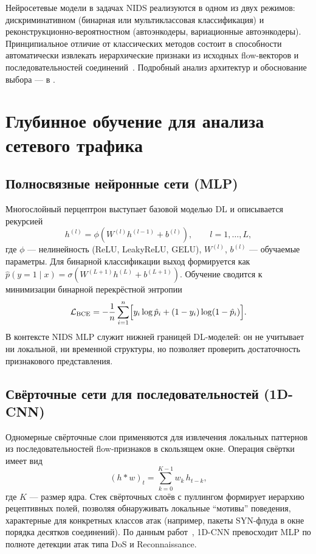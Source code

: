 Нейросетевые модели в задачах NIDS реализуются в одном из двух режимов:
дискриминативном (бинарная или мультиклассовая классификация) и
реконструкционно-вероятностном (автоэнкодеры, вариационные автоэнкодеры).
Принципиальное отличие от классических методов состоит в способности
автоматически извлекать иерархические признаки из исходных flow-векторов и
последовательностей соединений~\cite{lecun2015dl, vinayakumar2019dl,
mirsky2018kitsune}. Подробный анализ архитектур и обоснование выбора --- в
.

\section{Глубинное обучение для анализа сетевого трафика}
\label{sec:dl-architectures}

\subsection{Полносвязные нейронные сети (MLP)}

Многослойный перцептрон выступает базовой моделью DL и описывается
рекурсией
\begin{equation}
h^{(l)} = \phi\!\left(W^{(l)} h^{(l-1)} + b^{(l)}\right),
\qquad l = 1, \dots, L,
\label{eq:mlp}
\end{equation}
где \(\phi\) --- нелинейность (ReLU, LeakyReLU, GELU), \(W^{(l)}\), \(b^{(l)}\)
--- обучаемые параметры. Для бинарной классификации выход формируется как
\(\hat{p}(y=1\mid x) = \sigma(W^{(L+1)} h^{(L)} + b^{(L+1)})\). Обучение
сводится к минимизации бинарной перекрёстной энтропии
\begin{equation}
\mathcal{L}_{\text{BCE}} =
-\frac{1}{n}\sum_{i=1}^{n}\Bigl[y_i \log \hat{p}_i + (1-y_i)\log(1-\hat{p}_i)\Bigr].
\label{eq:bce}
\end{equation}
В контексте NIDS MLP служит нижней границей DL-моделей: он не учитывает ни
локальной, ни временной структуры, но позволяет проверить достаточность
признакового представления.

\subsection{Свёрточные сети для последовательностей (1D-CNN)}

Одномерные свёрточные слои применяются для извлечения локальных паттернов из
последовательностей flow-признаков в скользящем окне. Операция
свёртки имеет вид
\begin{equation}
(h * w)_t = \sum_{k=0}^{K-1} w_k\, h_{t-k},
\label{eq:conv1d}
\end{equation}
где \(K\) --- размер ядра. Стек свёрточных слоёв с пуллингом формирует
иерархию рецептивных полей, позволяя обнаруживать локальные ``мотивы''
поведения, характерные для конкретных классов атак (например, пакеты SYN-флуда
в окне порядка десятков соединений). По данным
работ~\cite{vinayakumar2019dl, ferrag2020dlcyber}, 1D-CNN превосходит MLP по
полноте детекции атак типа DoS и Reconnaissance.

